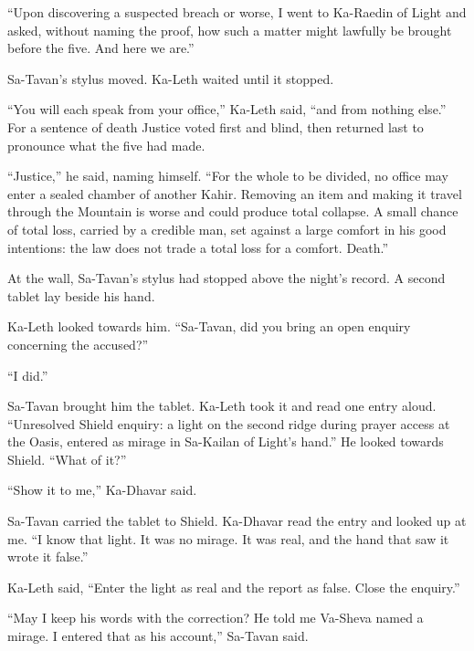 ``Upon discovering a suspected breach or worse, I went to Ka-Raedin of Light and asked, without naming the proof, how such a matter might lawfully be brought before the five. And here we are.''\par

Sa-Tavan's stylus moved. Ka-Leth waited until it stopped.\par

``You will each speak from your office,'' Ka-Leth said, ``and from nothing else.'' For a sentence of death Justice voted first and blind, then returned last to pronounce what the five had made.\par

``Justice,'' he said, naming himself. ``For the whole to be divided, no office may enter a sealed chamber of another Kahir. Removing an item and making it travel through the Mountain is worse and could produce total collapse. A small chance of total loss, carried by a credible man, set against a large comfort in his good intentions: the law does not trade a total loss for a comfort. Death.''\par

At the wall, Sa-Tavan's stylus had stopped above the night's record. A second tablet lay beside his hand.\par

Ka-Leth looked towards him. ``Sa-Tavan, did you bring an open enquiry concerning the accused?''\par

``I did.''\par

Sa-Tavan brought him the tablet. Ka-Leth took it and read one entry aloud. ``Unresolved Shield enquiry: a light on the second ridge during prayer access at the Oasis, entered as mirage in Sa-Kailan of Light's hand.'' He looked towards Shield. ``What of it?''\par

``Show it to me,'' Ka-Dhavar said.\par

Sa-Tavan carried the tablet to Shield. Ka-Dhavar read the entry and looked up at me. ``I know that light. It was no mirage. It was real, and the hand that saw it wrote it false.'' \par

Ka-Leth said, ``Enter the light as real and the report as false. Close the enquiry.''\par

``May I keep his words with the correction? He told me Va-Sheva named a mirage. I entered that as his account,'' Sa-Tavan said.\par

